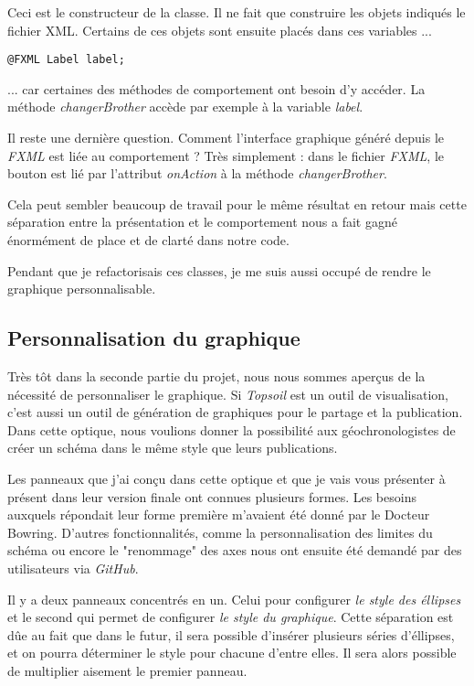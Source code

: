 Ceci est le constructeur de la classe. Il ne fait que construire les objets indiqués le fichier XML. Certains de ces objets sont ensuite placés dans ces variables ...
\begin{verbatim}
@FXML Label label;
\end{verbatim}
... car certaines des méthodes de comportement ont besoin d'y accéder. La méthode \textit{changerBrother} accède par exemple à la variable \textit{label}.

Il reste une dernière question. Comment l'interface graphique généré depuis le \textit{FXML} est liée au comportement ? Très simplement : dans le fichier \textit{FXML}, le bouton est lié par l'attribut \textit{onAction} à la méthode \textit{changerBrother}.

Cela peut sembler beaucoup de travail pour le même résultat en retour mais cette séparation entre la présentation et le comportement nous a fait gagné énormément de place et de clarté dans notre code.

Pendant que je refactorisais ces classes, je me suis aussi occupé de rendre le graphique personnalisable.

\subsection{Personnalisation du graphique}
Très tôt dans la seconde partie du projet, nous nous sommes aperçus de la nécessité de personnaliser le graphique. Si \textit{Topsoil} est un outil de visualisation, c'est aussi un outil de génération de graphiques pour le partage et la publication. Dans cette optique, nous voulions donner la possibilité aux géochronologistes de créer un schéma dans le même style que leurs publications.

Les panneaux que j'ai conçu dans cette optique et que je vais vous présenter à présent dans leur version finale ont connues plusieurs formes. Les besoins auxquels répondait leur forme première m'avaient été donné par le Docteur Bowring. D'autres fonctionnalités, comme la personnalisation des limites du schéma ou encore le "renommage" des axes nous ont ensuite été demandé par des utilisateurs via \textit{GitHub}.


Il y a deux panneaux concentrés en un. Celui pour configurer \emph{le style des éllipses} et le second qui permet de configurer \emph{le style du graphique}. Cette séparation est dûe au fait que dans le futur, il sera possible d'insérer plusieurs séries d'éllipses, et on pourra déterminer le style pour chacune d'entre elles. Il sera alors possible de multiplier aisement le premier panneau.

